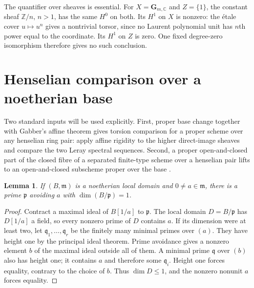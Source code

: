 \documentclass[11pt,a4paper]{article}
\newtheorem{lemma}[theorem]{Lemma}
\theoremstyle{definition}
\newcommand{\C}{\mathbb C}
\newcommand{\Z}{\mathbb Z}
\begin{document}
The quantifier over sheaves is essential. For $X=\mathbf G_{m,\C}$ and $Z=\{1\}$, the constant sheaf $\Z/n$, $n>1$, has the same $H^0$ on both. Its $H^1$ on $X$ is nonzero: the étale cover $u\mapsto u^n$ gives a nontrivial torsor, since no Laurent polynomial unit has $n$th power equal to the coordinate. Its $H^1$ on $Z$ is zero. One fixed degree-zero isomorphism therefore gives no such conclusion.

\section{Henselian comparison over a noetherian base}\label{sec:noetherian}
Two standard inputs will be used explicitly. First, proper base change together with Gabber's affine theorem gives torsion comparison for a proper scheme over any henselian ring pair: apply affine rigidity to the higher direct-image sheaves and compare the two Leray spectral sequences. Second, a proper open-and-closed part of the closed fibre of a separated finite-type scheme over a henselian pair lifts to an open-and-closed subscheme proper over the base \cite[Lemma~37.53.9, tag 0CT9]{Stacks}.

\begin{lemma}\label{lem:local-curve}
If $(B,\mathfrak m)$ is a noetherian local domain and $0\ne a\in\mathfrak m$, there is a prime $\mathfrak p$ avoiding $a$ with $\dim(B/\mathfrak p)=1$.
\end{lemma}
\begin{proof}
Contract a maximal ideal of $B[1/a]$ to $\mathfrak p$. The local domain $D=B/\mathfrak p$ has $D[1/a]$ a field, so every nonzero prime of $D$ contains $a$. If its dimension were at least two, let $\mathfrak q_1,\ldots,\mathfrak q_r$ be the finitely many minimal primes over $(a)$. They have height one by the principal ideal theorem. Prime avoidance gives a nonzero element $b$ of the maximal ideal outside all of them. A minimal prime $\mathfrak q$ over $(b)$ also has height one; it contains $a$ and therefore some $\mathfrak q_i$. Height one forces equality, contrary to the choice of $b$. Thus $\dim D\le1$, and the nonzero nonunit $a$ forces equality.
\end{proof}
\end{document}
